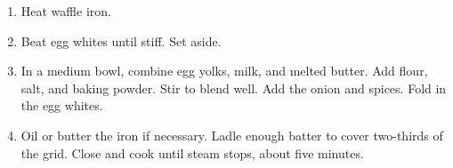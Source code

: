 
\begin{ingredients}
\end{ingredients}


\begin{recipe}
  \begin{enumerate}

  \item Heat waffle iron.

  \item Beat egg whites until stiff.  Set aside.

  \item In a medium bowl, combine egg yolks, milk, and melted butter.
    Add flour, salt, and baking powder.  Stir to blend well.  Add the
    onion and spices.  Fold in the egg whites.

  \item Oil or butter the iron if necessary.  Ladle enough batter to
    cover two-thirds of the grid.  Close and cook until steam stops,
    about five minutes.

  \end{enumerate}
\end{recipe}
